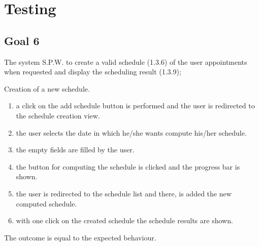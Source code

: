 \chapter{Testing}

\section{Goal 6}

The system S.P.W. to create a valid schedule (1.3.6) of the user appointments when
requested and display the scheduling result (1.3.9);

{Creation of a new schedule.}
{{\begin{enumerate}
\item a click on the add schedule button is performed and the user is redirected to the schedule creation view.
\item the user selects the date in which he/she wants compute his/her schedule.
\item the empty fields are filled by the user.
\item the button for computing the schedule is clicked and the progress bar is shown.
\item the user is redirected to the schedule list and there, is added the new computed schedule.
\item with one click on the created schedule the schedule results are shown.
\end{enumerate}}}
{The outcome is equal to the expected behaviour.}







